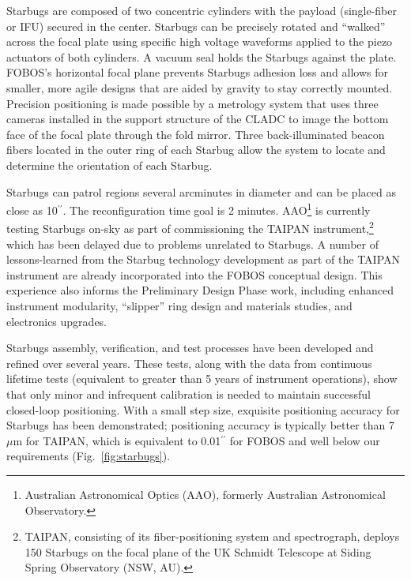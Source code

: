 \documentclass[oneside,11pt]{amsart}
\newcommand{\arcsec}{\mbox{$^{\prime\prime}$}}
\begin{document}
Starbugs are composed of two concentric cylinders with the payload (single-fiber or IFU) secured in the center. Starbugs can be precisely rotated and ``walked'' across the focal plate using specific high voltage waveforms applied to the piezo actuators of both cylinders. A vacuum seal holds the Starbugs against the plate. FOBOS's horizontal focal plane prevents Starbugs adhesion loss and allows for smaller, more agile designs that are aided by gravity to stay correctly mounted. Precision positioning is made possible by a metrology system that uses three cameras installed in the support structure of the CLADC to image the bottom face of the focal plate through the fold mirror. Three back-illuminated beacon fibers located in the outer ring of each Starbug allow the system to locate and determine the orientation of each Starbug.


Starbugs can patrol regions several arcminutes in diameter and can be placed as close as 10\arcsec{}. The reconfiguration time goal is 2 minutes. AAO\footnote{Australian Astronomical Optics (AAO), formerly Australian Astronomical Observatory.} is currently testing Starbugs on-sky as part of commissioning the TAIPAN instrument,\footnote{TAIPAN, consisting of its fiber-positioning system and spectrograph, deploys 150 Starbugs on the focal plane of the UK Schmidt Telescope at Siding Spring Observatory (NSW, AU).} which has been delayed due to problems unrelated to Starbugs. A number of lessons-learned from the Starbug technology development as part of the TAIPAN instrument are already incorporated into the FOBOS conceptual design.  This experience also informs the Preliminary Design Phase work, including enhanced instrument modularity, ``slipper'' ring design and materials studies, and electronics upgrades.

Starbugs assembly, verification, and test processes have been developed and refined over several years. These tests, along with the data from continuous lifetime tests (equivalent to greater than 5 years of instrument operations), show that only minor and infrequent calibration is needed to maintain successful closed-loop positioning. With a small step size, exquisite positioning accuracy for Starbugs has been demonstrated; positioning accuracy is typically better than 7 $\mu$m for TAIPAN, which is equivalent to 0.01\arcsec{} for FOBOS and well below our requirements  (Fig.~\ref{fig:starbugs}). 
\end{document}
